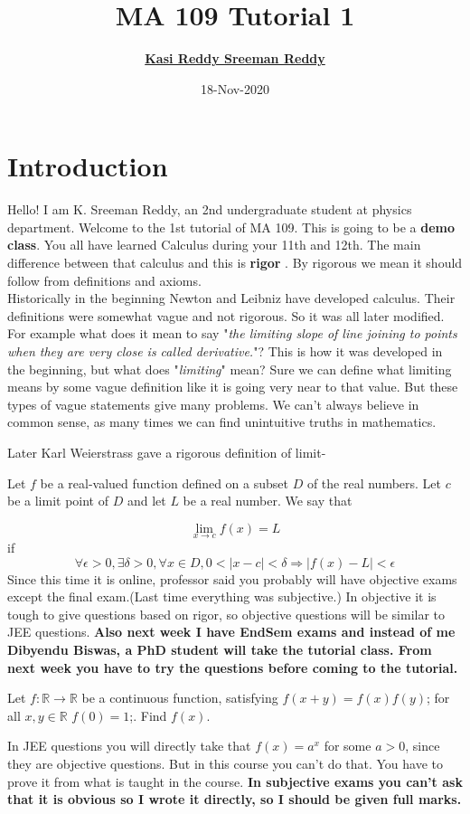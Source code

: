 \documentclass[11pt]{beamer}
\author[K. Sreeman Reddy]{\href{http://iamsreeman.github.io/}{\textbf{Kasi Reddy Sreeman Reddy}}\linebreak\text{2nd year physics student}\linebreak\text{\href{http://iamsreeman.github.io/MA109}{http://iamsreeman.github.io/MA109}}}
\title{MA 109 Tutorial 1}
\institute[]{IIT Bombay}
\date{18-Nov-2020}
\begin{document}
\begin{frame}
\titlepage
\end{frame}


\section{Introduction}
Hello! I am K. Sreeman Reddy, an 2nd undergraduate student at physics department. Welcome to the 1st tutorial of MA 109. This is going to be a \textbf{demo class}. You all have learned Calculus during your 11th and 12th. The main difference between that calculus and this is \textbf{rigor }. By rigorous we mean it should follow from definitions and axioms.\\
Historically in the beginning Newton and Leibniz have developed calculus. Their definitions were somewhat vague and not rigorous. So it was all later modified. For example what does it mean to say "\textit{the limiting slope of line joining to points when they are very close is called derivative.}"? This is how it was developed in the beginning, but what does "\textit{limiting}" mean? Sure we can define what limiting means by some vague definition like it is going very near to that value. But these types of vague statements give many problems. We can't always believe in common sense, as many times we can find unintuitive truths in mathematics. 
\begin{frame}
Later Karl Weierstrass gave a rigorous definition of limit-
\begin{definition}
Let ${\displaystyle f}$ be a real-valued function defined on a subset $ {\displaystyle D}$ of the real numbers. Let ${\displaystyle c}$ be a limit point of ${\displaystyle D}$ and let ${\displaystyle L}$ be a real number. We say that

    $${\displaystyle \lim _{x\to c}f(x)=L}$$
if
$$\forall \epsilon>0,\exists\delta>0,\forall x\in D,0<|x-c|<\delta\Rightarrow |f(x)-L|<\epsilon$$
Since this time it is online, professor said you probably will have objective exams except the final exam.(Last time everything was subjective.) In objective it is tough to give questions based on rigor, so objective questions will be similar to JEE questions. \textbf{Also next week I have EndSem exams and instead of me Dibyendu Biswas, a PhD student will take the tutorial class. From next week you have to try the questions before coming to the tutorial.}
\end{definition}
\end{frame} 
\begin{frame}
\begin{example}
Let $f : \mathbb{R} \rightarrow \mathbb{R}$ be a continuous function, satisfying
$f(x + y) = f(x)f(y)$; for all $x,y \in \mathbb{R}$ $f(0) = 1$;. Find $f(x)$.
\end{example}
In JEE questions you will directly take that $f(x)=a^x$ for some $a>0$, since they are objective questions. But in this course you can't do that. You have to prove it from what is taught in the course. \textbf{In subjective exams you can't ask that it is obvious so I wrote it directly, so I should be given full marks.}
\end{frame}
\end{document}
